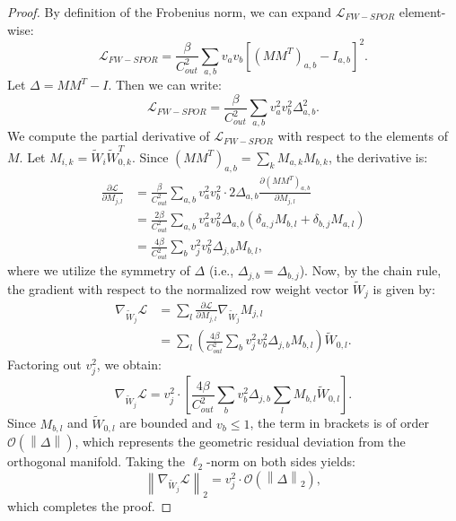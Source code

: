 \documentclass{article}
\theoremstyle{plain}
\theoremstyle{definition}
\theoremstyle{remark}
\begin{document}
\begin{proof}
By definition of the Frobenius norm, we can expand $\mathcal{L}_{FW-SPOR}$ element-wise:
\begin{equation}
    \mathcal{L}_{FW-SPOR} = \frac{\beta}{C_{out}^2} \sum_{a,b} v_a v_b \left[ (M M^T)_{a,b} - I_{a,b} \right]^2.
\end{equation}
Let $\Delta = M M^T - I$. Then we can write:
\begin{equation}
    \mathcal{L}_{FW-SPOR} = \frac{\beta}{C_{out}^2} \sum_{a,b} v_a^2 v_b^2 \Delta_{a,b}^2.
\end{equation}
We compute the partial derivative of $\mathcal{L}_{FW-SPOR}$ with respect to the elements of $M$. Let $M_{i,k} = \tilde{W}_i \tilde{W}_{0,k}^T$. Since $(M M^T)_{a,b} = \sum_k M_{a,k} M_{b,k}$, the derivative is:
\begin{align*}
    \frac{\partial \mathcal{L}}{\partial M_{j,l}} &= \frac{\beta}{C_{out}^2} \sum_{a,b} v_a^2 v_b^2 \cdot 2 \Delta_{a,b} \frac{\partial (M M^T)_{a,b}}{\partial M_{j,l}} \\
    &= \frac{2\beta}{C_{out}^2} \sum_{a,b} v_a^2 v_b^2 \Delta_{a,b} \left( \delta_{a,j} M_{b,l} + \delta_{b,j} M_{a,l} \right) \\
    &= \frac{4\beta}{C_{out}^2} \sum_{b} v_j^2 v_b^2 \Delta_{j,b} M_{b,l},
\end{align*}
where we utilize the symmetry of $\Delta$ (i.e., $\Delta_{j,b} = \Delta_{b,j}$).
Now, by the chain rule, the gradient with respect to the normalized row weight vector $\tilde{W}_j$ is given by:
\begin{align*}
    \nabla_{\tilde{W}_j} \mathcal{L} &= \sum_{l} \frac{\partial \mathcal{L}}{\partial M_{j,l}} \nabla_{\tilde{W}_j} M_{j,l} \\
    &= \sum_{l} \left( \frac{4\beta}{C_{out}^2} \sum_{b} v_j^2 v_b^2 \Delta_{j,b} M_{b,l} \right) \tilde{W}_{0,l}.
\end{align*}
Factoring out $v_j^2$, we obtain:
\begin{equation*}
    \nabla_{\tilde{W}_j} \mathcal{L} = v_j^2 \cdot \left[ \frac{4\beta}{C_{out}^2} \sum_{b} v_b^2 \Delta_{j,b} \sum_{l} M_{b,l} \tilde{W}_{0,l} \right].
\end{equation*}
Since $M_{b,l}$ and $\tilde{W}_{0,l}$ are bounded and $v_b \le 1$, the term in brackets is of order $\mathcal{O}(\left\|\Delta\right\|)$, which represents the geometric residual deviation from the orthogonal manifold. Taking the $\ell_2$-norm on both sides yields:
\begin{equation*}
    \left\| \nabla_{\tilde{W}_j} \mathcal{L} \right\|_2 = v_j^2 \cdot \mathcal{O}(\left\|\Delta\right\|_2),
\end{equation*}
which completes the proof.
\end{proof}
\end{document}
